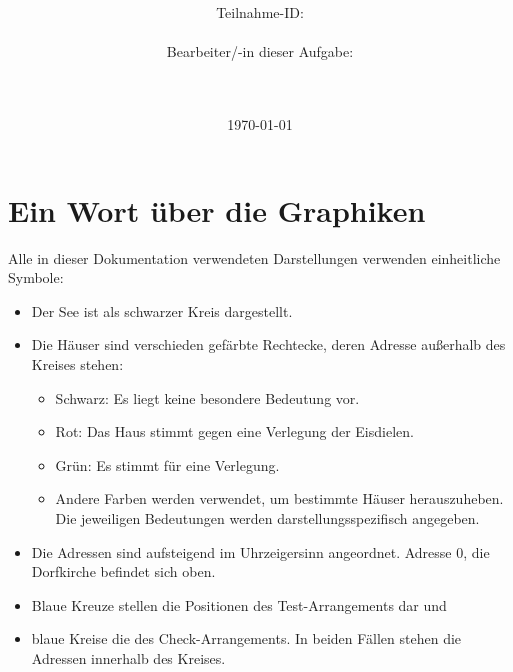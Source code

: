 \documentclass[a4paper,10pt,ngerman]{scrartcl}
\title{\textbf{\Huge\Aufgabe}}
\author{\LARGE Teilnahme-ID: \LARGE \TeilnahmeId \\\\
	    \LARGE Bearbeiter/-in dieser Aufgabe: \\ 
	    \LARGE \Name\\\\}
\date{\LARGE\today}
\begin{document}
\maketitle
\tableofcontents

\vspace{0.5cm}

\section{Ein Wort über die Graphiken}
Alle in dieser Dokumentation verwendeten Darstellungen verwenden einheitliche Symbole:
\begin{itemize}
    \item Der See ist als schwarzer Kreis dargestellt.
    \item Die Häuser sind verschieden gefärbte Rechtecke, deren Adresse außerhalb des Kreises stehen:
          \begin{itemize}
              \item Schwarz: Es liegt keine besondere Bedeutung vor.
              \item Rot: Das Haus stimmt gegen eine Verlegung der Eisdielen.
              \item Grün: Es stimmt für eine Verlegung.
              \item Andere Farben werden verwendet, um bestimmte Häuser herauszuheben.
                    Die jeweiligen Bedeutungen werden darstellungsspezifisch angegeben.
          \end{itemize}
    \item Die Adressen sind aufsteigend im Uhrzeigersinn angeordnet.
          Adresse $0$, die Dorfkirche befindet sich oben.
    \item Blaue Kreuze stellen die Positionen des Test-Arrangements dar und
    \item blaue Kreise die des Check-Arrangements.
          In beiden Fällen stehen die Adressen innerhalb des Kreises.
\end{itemize}
\end{document}
